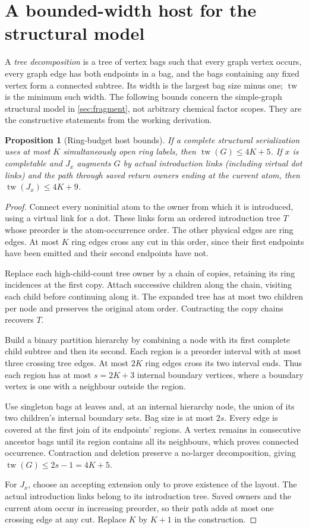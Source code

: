 \documentclass[11pt,a4paper]{article}
\newtheorem{proposition}{Proposition}
\newcommand{\tw}{\operatorname{tw}}
\begin{document}
\appendix
\section{A bounded-width host for the structural model}\label{app:width}
A \emph{tree decomposition} is a tree of vertex bags such that every graph vertex
occurs, every graph edge has both endpoints in a bag, and the bags containing
any fixed vertex form a connected subtree. Its width is the largest bag size
minus one; \(\tw\) is the minimum such width. The following bounds concern the
simple-graph structural model in \cref{sec:fragment},
not arbitrary chemical factor scopes. They are the constructive statements
from the working derivation.\cite{attempt}

\begin{proposition}[Ring-budget host bounds]
If a complete structural serialization uses at most \(K\) simultaneously open
ring labels, then \(\tw(G)\le4K+5\). If \(x\) is completable and \(J_x\) augments
\(G\) by actual introduction links (including virtual dot links) and the path
through saved return owners ending at the current atom, then
\(\tw(J_x)\le4K+9\).
\end{proposition}
\begin{proof}
Connect every noninitial atom to the owner from which it is introduced, using
a virtual link for a dot. These links form an ordered introduction tree \(T\)
whose preorder is the atom-occurrence order. The other physical edges are ring
edges. At most \(K\) ring edges cross any cut in this order, since their first
endpoints have been emitted and their second endpoints have not.

Replace each high-child-count tree owner by a chain of copies, retaining its
ring incidences at the first copy. Attach successive children along the chain,
visiting each child before continuing along it. The expanded tree has at most
two children per node and preserves the original atom order. Contracting the
copy chains recovers \(T\).

Build a binary partition hierarchy by combining a node with its first complete
child subtree and then its second. Each region is a preorder interval with at
most three crossing tree edges. At most \(2K\) ring edges cross its two interval
ends. Thus each region has at most \(s=2K+3\) internal boundary vertices, where
a boundary vertex is one with a neighbour outside the region.

Use singleton bags at leaves and, at an internal hierarchy node, the union of
its two children's internal boundary sets. Bag size is at most \(2s\). Every
edge is covered at the first join of its endpoints' regions. A vertex remains
in consecutive ancestor bags until its region contains all its neighbours,
which proves connected occurrence. Contraction and deletion preserve a
no-larger decomposition, giving \(\tw(G)\le2s-1=4K+5\).

For \(J_x\), choose an accepting extension only to prove existence of the layout.
The actual introduction links belong to its introduction tree. Saved owners
and the current atom occur in increasing preorder, so their path adds at most
one crossing edge at any cut. Replace \(K\) by \(K+1\) in the construction.
\end{proof}
\end{document}
